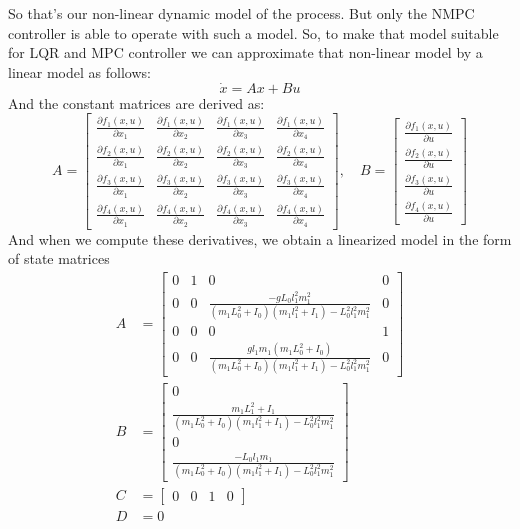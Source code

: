 So that’s our non-linear dynamic model of the process. But only the NMPC controller is able to operate with such a model.  So, to make that model suitable for LQR and MPC controller we can approximate that non-linear model by a linear model as follows:
\begin{equation}\dot{x} = Ax + Bu\end{equation}
And the constant matrices are derived as:
\begin{equation}
A = \begin{bmatrix}
\frac{\partial f_1(x,u)}{\partial x_1}&\frac{\partial f_1(x,u)}{\partial x_2}&\frac{\partial f_1(x,u)}{\partial x_3}&\frac{\partial f_1(x,u)}{\partial x_4}\\
\frac{\partial f_2(x,u)}{\partial x_1}&\frac{\partial f_2(x,u)}{\partial x_2}&\frac{\partial f_2(x,u)}{\partial x_3}&\frac{\partial f_2(x,u)}{\partial x_4}\\
\frac{\partial f_3(x,u)}{\partial x_1}&\frac{\partial f_3(x,u)}{\partial x_2}&\frac{\partial f_3(x,u)}{\partial x_3}&\frac{\partial f_3(x,u)}{\partial x_4}\\
\frac{\partial f_4(x,u)}{\partial x_1}&\frac{\partial f_4(x,u)}{\partial x_2}&\frac{\partial f_4(x,u)}{\partial x_3}&\frac{\partial f_4(x,u)}{\partial x_4}
\end{bmatrix}, \quad B = \begin{bmatrix}
\frac{\partial f_1(x,u)}{\partial u}\\\frac{\partial f_2(x,u)}{\partial u}\\\frac{\partial f_3(x,u)}{\partial u}\\\frac{\partial f_4(x,u)}{\partial u}
\end{bmatrix}
\end{equation}
And when we compute these derivatives, we obtain a linearized model in the form of state matrices
\begin{subequations}
	\begin{align}
		A &=\begin{bmatrix}0&1&0&0\\
				0&0&\frac{-gL_0l_1^2m_1^2}{(m_1L_0^2+I_0)(m_1l_1^2+I_1)-L_0^2l_1^2m_1^2}&0\\
				0&0&0&1\\
				0&0&\frac{gl_1m_1(m_1L_0^2+I_0)}{(m_1L_0^2+I_0)(m_1l_1^2+I_1)-L_0^2l_1^2m_1^2}&0
			\end{bmatrix}\\
		B &=	\begin{bmatrix}
				0\\ 
				\frac{m_1L_1^2+I_1}{(m_1L_0^2+I_0)(m_1l_1^2+I_1)-L_0^2l_1^2m_1^2}\\
				0\\
				\frac{-L_0l_1m_1}{(m_1L_0^2+I_0)(m_1l_1^2+I_1)-L_0^2l_1^2m_1^2}
			\end{bmatrix}\\
		C &= \begin{bmatrix}0&0&1&0\end{bmatrix}\\
		D &= 0
	\end{align}
\end{subequations}
